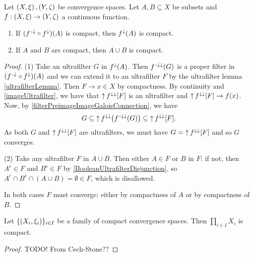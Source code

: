 \begin{proposition} \label{compactConstructions}
Let $\left( X,\xi \right), \left( Y,\zeta \right)$ be convergence spaces. Let $A,B\subseteq X$ be subsets and $f: \left( X,\xi \right)\to \left( Y,\zeta \right)$ a continuous function.
\begin{enumerate}
\item If $(f^{{\text{\hspace{0.15em}-}\downarrow}}\circ f^{\downarrow})(A)$ is compact, then $f^{\downarrow}(A)$ is compact.
\item If $A$ and $B$ are compact, then $A\cup B$ is compact.
\end{enumerate}
\end{proposition}
\begin{proof}
(1) Take an ultrafilter $G$ in $f^{\downarrow}(A)$. Then $f^{{\text{\hspace{0.15em}-}\downarrow}\downarrow}(G)$ is a proper filter in $(f^{{\text{\hspace{0.15em}-}\downarrow}}\circ f^{\downarrow})(A)$ and we can extend it to an ultrafilter $F$ by the ultrafilter lemma \ref{ultrafilterLemma}. Then $F\to x\in X$ by compactness. By continuity and \ref{imageUltrafilter}, we have that $\operatorname{\uparrow} f^{\downarrow\downarrow}[F]$ is an ultrafilter and $\operatorname{\uparrow} f^{\downarrow\downarrow}[F] \to f(x)$. Now, by \ref{filterPreimageImageGaloisConnection}, we have
\[ G \subseteq \operatorname{\uparrow} f^{\downarrow\downarrow}\big(f^{{\text{\hspace{0.15em}-}\downarrow}\downarrow}(G)\big) \subseteq \operatorname{\uparrow} f^{\downarrow\downarrow}[F]. \]
As both $G$ and $\operatorname{\uparrow} f^{\downarrow\downarrow}[F]$ are ultrafilters, we must have $G = \operatorname{\uparrow} f^{\downarrow\downarrow}[F]$ and so $G$ converges.

(2) Take any ultrafilter $F$ in $A\cup B$. Then either $A\in F$ or $B$ in $F$: if not, then $A^c\in F$ and $B^c \in F$ by \ref{BooleanUltrafilterDisjunction}, so $A^c\cap B^c\cap (A\cup B) = \emptyset \in F$, which is disallowed.

In both cases $F$ must converge: either by compactness of $A$ or by compactness of $B$.
\end{proof}

\begin{theorem}[Tychonoff]
Let $\{\left( X_i, \xi_i \right)\}_{i\in I}$ be a family of compact convergence spaces. Then $\prod_{i\in I}X_i$ is compact.
\end{theorem}
\begin{proof}
TODO! From Cech-Stone??
\end{proof}

